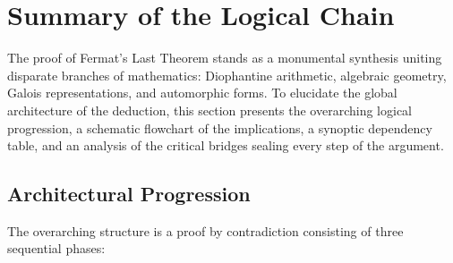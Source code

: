 \documentclass[11pt,a4paper]{article}
\theoremstyle{plain}
\theoremstyle{definition}
\theoremstyle{remark}
\begin{document}
\section{Summary of the Logical Chain}

The proof of Fermat's Last Theorem stands as a monumental synthesis uniting disparate branches of mathematics: Diophantine arithmetic, algebraic geometry, Galois representations, and automorphic forms. To elucidate the global architecture of the deduction, this section presents the overarching logical progression, a schematic flowchart of the implications, a synoptic dependency table, and an analysis of the critical bridges sealing every step of the argument.

\subsection{Architectural Progression}

The overarching structure is a proof by contradiction consisting of three sequential phases:
\end{document}
